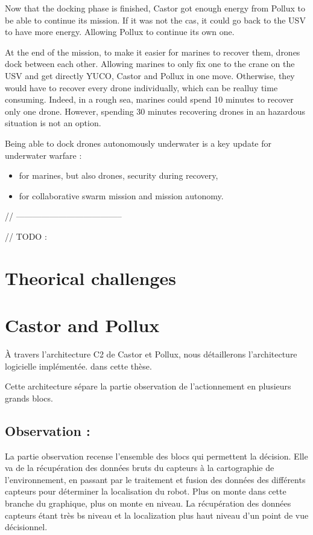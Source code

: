 \documentclass[twocolumn]{article}
\begin{document}
Now that the docking phase is finished, Castor got enough energy from Pollux to be able to continue its mission. If it was not the cas, it could go back to the USV to have more energy. Allowing Pollux to continue its own one.

At the end of the mission, to make it easier for marines to recover them, drones dock between each other. Allowing marines to only fix one to the crane on the USV and get directly YUCO, Castor and Pollux in one move. Otherwise, they would have to recover every drone individually, which can be realluy time consuming. Indeed, in a rough sea, marines could spend 10 minutes to recover only one drone. However, spending 30 minutes recovering drones in an hazardous situation is not an option. 

Being able to dock drones autonomously underwater is a key update for underwater warfare :

\begin{itemize}
    \item for marines, but also drones, security during recovery,
    \item for collaborative swarm mission and mission autonomy.
\end{itemize}



// --------------------------------------

// TODO :

\section{Theorical challenges}




\section{Castor and Pollux}

À travers l'architecture C2 de Castor et Pollux, nous détaillerons l'architecture logicielle implémentée. dans cette thèse. 

Cette architecture sépare la partie observation de l'actionnement en plusieurs grands blocs. 

\subsection{Observation :}

La partie observation recense l'ensemble des blocs qui permettent la décision. Elle va de la récupération des données bruts du capteurs à la cartographie de l'environnement, en passant par le traitement et fusion des données des différents capteurs pour déterminer la localisation du robot. 
Plus on monte dans cette branche du graphique, plus on monte en niveau. La récupération des données capteurs étant très bs niveau et la localization plus haut niveau d'un point de vue décisionnel. 
\end{document}
